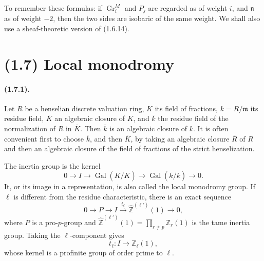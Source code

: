 \documentclass[11pt]{article}
\theoremstyle{remark}
\newcommand{\Gr}{\operatorname{Gr}}
\newcommand{\Gal}{\operatorname{Gal}}
\begin{document}
To remember these formulas: if $\Gr^M_i$ and $P_j$ are regarded as of weight $i$, and $\mathfrak n$ as of weight $-2$, then the two sides are isobaric of the same weight. We shall also use a sheaf-theoretic version of (1.6.14).

\section*{(1.7) Local monodromy}

\paragraph{(1.7.1).} Let $R$ be a henselian discrete valuation ring, $K$ its field of fractions, $k=R/\mathfrak m$ its residue field, $\overline K$ an algebraic closure of $K$, and $\overline k$ the residue field of the normalization of $R$ in $\overline K$. Then $\overline k$ is an algebraic closure of $k$. It is often convenient first to choose $\overline k$, and then $\overline K$, by taking an algebraic closure $\overline R$ of $R$ and then an algebraic closure of the field of fractions of the strict henselization.

The inertia group is the kernel
\begin{equation}\tag{1.7.1.1}
        0\longrightarrow I\longrightarrow \Gal(\overline K/K)\longrightarrow \Gal(\overline k/k)\longrightarrow0.
\end{equation}
It, or its image in a representation, is also called the local monodromy group. If $\ell$ is different from the residue characteristic, there is an exact sequence
\[
        0\longrightarrow P\longrightarrow I\xrightarrow{t_\ell}\widehat{\mathbb Z}^{(\ell')}(1)\longrightarrow0,
\]
where $P$ is a pro-$p$-group and $\widehat{\mathbb Z}^{(\ell')}(1)=\prod_{r\ne p}\mathbb Z_r(1)$ is the tame inertia group. Taking the $\ell$-component gives
\[
        t_\ell:I\longrightarrow \mathbb Z_\ell(1),
\]
whose kernel is a profinite group of order prime to $\ell$.
\end{document}
